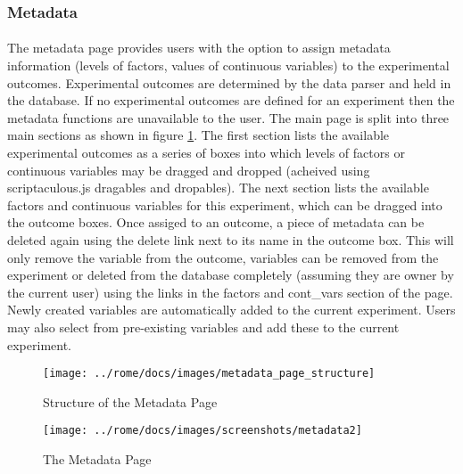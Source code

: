 \subsubsection{Metadata}
\label{sec:view_metadata}

\paragraph{}
The metadata page provides users with the option to assign metadata information (levels of factors, values of continuous variables) to the experimental outcomes. Experimental outcomes are determined by the data parser and held in the database. If no experimental outcomes are defined for an experiment then the metadata functions are unavailable to the user. The main page is split into three main sections as shown in figure \ref{fig:metadata_page_structure}. The first section lists the available experimental outcomes as a series of boxes into which levels of factors or continuous variables may be dragged and dropped (acheived using scriptaculous.js dragables and dropables). The next section lists the available factors and continuous variables for this experiment, which can be dragged into the outcome boxes. Once assiged to an outcome, a piece of metadata can be deleted again using the delete link next to its name in the outcome box. This will only remove the variable from the outcome, variables can be removed from the experiment or deleted from the database completely (assuming they are owner by the current user) using the links in the factors and cont\_vars section of the page. Newly created variables are automatically added to the current experiment. Users may also select from pre-existing variables and add these to the current experiment.


\begin{figure}[h]
\centering
\texttt{[image: ../rome/docs/images/metadata\_page\_structure]}
\caption{Structure of the Metadata Page}\label{fig:metadata_page_structure}
\end{figure}



\begin{figure}[h]
\centering
\texttt{[image: ../rome/docs/images/screenshots/metadata2]}
\caption{The Metadata Page}\label{fig:metadata_view}
\end{figure}

\clearpage